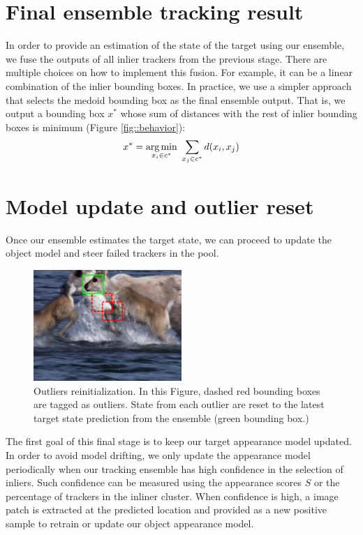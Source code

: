 \section{Final ensemble tracking result}
In order to provide an estimation of the state of the target using our
ensemble, we fuse the outputs of all inlier trackers from the previous stage.
There are multiple choices on how to implement this fusion. For example,
it can be a linear combination of the inlier bounding boxes. In practice,
we use a simpler approach that selects the medoid bounding box as the final
ensemble output. That is, we output a
bounding box $x^{*}$
whose sum of distances with the rest of inlier bounding boxes
is minimum (Figure \ref{fig::behavior}):
\begin{equation}
x^{*} = \operatorname*{arg\,min}_{x_{i} \in c^*}  ~\sum_{x_{j} \in c^{*}}d(x_{i}, x_{j}) 
\end{equation}

\section{Model update and outlier reset}
Once our ensemble estimates the target state, we can proceed to update the
object model and steer failed trackers in the pool.

\begin{figure}[b!]
\centering
\includegraphics[width=0.5\textwidth]{Figures/clustering/deer_outliers.png}
\caption[Outliers reinitialization]{Outliers reinitialization. In this Figure,
dashed red bounding boxes are tagged as outliers. State from each outlier are
reset to the latest target state prediction from the ensemble (green bounding
box.)}
\label{fig::outliers}
\end{figure}

The first goal of this final stage is to keep our target appearance model
updated. In order to avoid model drifting, we only update the appearance
model periodically when our tracking ensemble has high confidence in the
selection of inliers. Such confidence can be measured using the appearance
scores $S$ or the percentage of trackers in the inliner cluster.
When confidence is high, a image patch is extracted at the predicted
location and provided as a new positive sample to retrain or update
our object appearance model.

